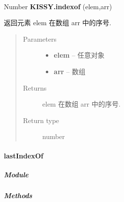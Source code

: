 \documentclass[letterpaper,10pt,english]{sphinxmanual}
\begin{document}
\begin{fulllineitems}
\label{api/seed/lang/indexOf:Lang.KISSY.indexOf}~
\begin{DUlineblock}{0em}
\item[] Number \textbf{KISSY.indexof} (elem,arr)
\item[] 返回元素 elem 在数组 arr 中的序号.
\end{DUlineblock}
\begin{quote}\begin{description}
\item[{Parameters}] \leavevmode\begin{itemize}
\item {}
\textbf{elem} -- 任意对象

\item {}
\textbf{arr} -- 数组

\end{itemize}

\item[{Returns}] \leavevmode
elem 在数组 arr 中的序号.

\item[{Return type}] \leavevmode
number

\end{description}\end{quote}

\end{fulllineitems}



\paragraph{lastIndexOf}
\label{api/seed/lang/lastIndexOf:lastindexof}\label{api/seed/lang/lastIndexOf::doc}

\subparagraph{Module}
\label{api/seed/lang/lastIndexOf:module}\begin{quote}

{\hyperref[api/seed/lang/index:module-Lang]{}}
\end{quote}


\subparagraph{Methods}
\label{api/seed/lang/lastIndexOf:methods}
\end{document}
